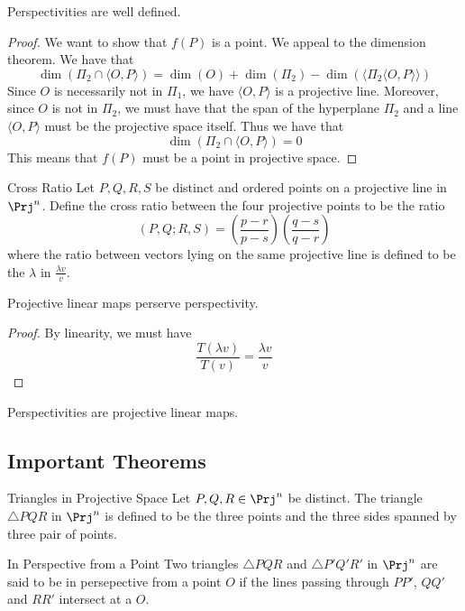 \documentclass[a4paper]{article}
\begin{document}
\begin{lmm}{}{} Perspectivities are well defined. \tcbline
\begin{proof}
We want to show that $f(P)$ is a point. We appeal to the dimension theorem. We have that $$\dim(\Pi_2\cap\langle O,P\rangle)=\dim(O)+\dim(\Pi_2)-\dim(\langle\Pi_2\langle O,P\rangle\rangle)$$ Since $O$ is necessarily not in $\Pi_1$, we have $\langle O,P\rangle$ is a projective line. Moreover, since $O$ is not in $\Pi_2$, we must have that the span of the hyperplane $\Pi_2$ and a line $\langle O,P\rangle$ must be the projective space itself. Thus we have that $$\dim(\Pi_2\cap\langle O,P\rangle)=0$$ This means that $f(P)$ must be a point in projective space. 
\end{proof}
\end{lmm}

\begin{defn}{Cross Ratio}{} Let $P,Q,R,S$ be distinct and ordered points on a projective line in $\Prj^n$. Define the cross ratio between the four projective points to be the ratio $$(P,Q;R,S)=\left(\frac{p-r}{p-s}\right)\left(\frac{q-s}{q-r}\right)$$ where the ratio between vectors lying on the same projective line is defined to be the $\lambda$ in $\frac{\lambda v}{v}$. 
\end{defn}

\begin{prp}{}{} Projective linear maps perserve perspectivity. \tcbline
\begin{proof}
By linearity, we must have $$\frac{T(\lambda v)}{T(v)}=\frac{\lambda v}{v}$$
\end{proof}
\end{prp}

\begin{lmm}{}{} Perspectivities are projective linear maps. 
\end{lmm}

\subsection{Important Theorems}
\begin{defn}{Triangles in Projective Space}{} Let $P,Q,R\in\Prj^n$ be distinct. The triangle $\triangle PQR$ in $\Prj^n$ is defined to be the three points and the three sides spanned by three pair of points. 
\end{defn}

\begin{defn}{In Perspective from a Point}{} Two triangles $\triangle PQR$ and $\triangle P'Q'R'$ in $\Prj^n$ are said to be in persepective from a point $O$ if the lines passing through $PP'$, $QQ'$ and $RR'$ intersect at a $O$. 
\end{defn}
\end{document}

